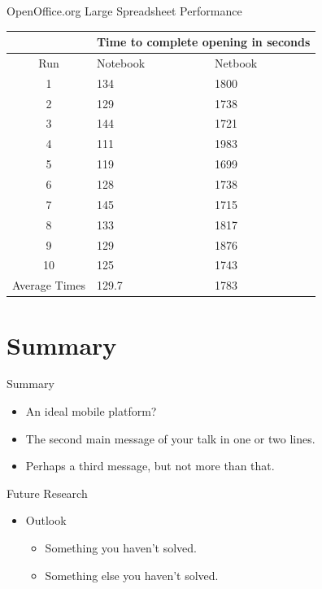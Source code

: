 \documentclass{beamer}
\begin{document}
\begin{frame}{OpenOffice.org Large Spreadsheet Performance}
  \begin{tabularx}{300pt}{| c | X | X |}
    \hline
    & \multicolumn{2}{c|}{Time to complete opening in seconds} \\ \hline
    Run               & Notebook & Netbook    \\ \hline
    1                 & 134      & 1800       \\ \hline
    2                 & 129      & 1738       \\ \hline
    3                 & 144      & 1721       \\ \hline
    4                 & 111      & 1983       \\ \hline
    5                 & 119      & 1699       \\ \hline
    6                 & 128      & 1738       \\ \hline
    7                 & 145      & 1715       \\ \hline
    8                 & 133      & 1817       \\ \hline
    9                 & 129      & 1876       \\ \hline
    10                & 125      & 1743       \\ \hline
    Average Times     & 129.7    & 1783       \\
    \hline
  \end{tabularx}
\end{frame}

\section*{Summary}

\begin{frame}{Summary}

\begin{itemize}
  \item An ideal mobile platform?
  \item The \alert{second main message} of your talk in one or two lines.
  \item Perhaps a \alert{third message}, but not more than that.
\end{itemize}

\end{frame}

\begin{frame}{Future Research}
\begin{itemize}
  \item Outlook
  \begin{itemize}
    \item Something you haven't solved.
    \item Something else you haven't solved.
  \end{itemize}
  \end{itemize}
\end{frame}
\end{document}
